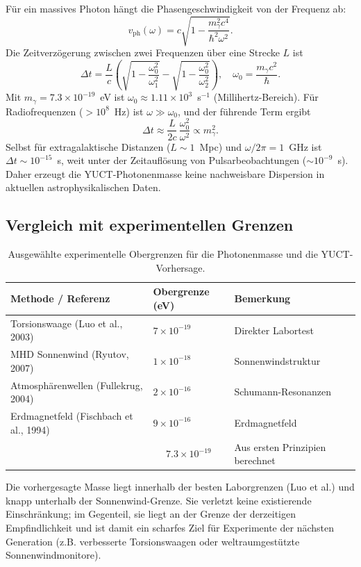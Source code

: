 \documentclass[12pt,a4paper]{article}
\begin{document}
	Für ein massives Photon hängt die Phasengeschwindigkeit von der Frequenz ab:
	\[
	v_{\text{ph}}(\omega) = c\sqrt{1 - \frac{m_\gamma^2 c^4}{\hbar^2\omega^2}} .
	\]
	Die Zeitverzögerung zwischen zwei Frequenzen über eine Strecke \(L\) ist
	\[
	\Delta t = \frac{L}{c}\left( \sqrt{1-\frac{\omega_0^2}{\omega_1^2}} - \sqrt{1-\frac{\omega_0^2}{\omega_2^2}} \right),
	\quad \omega_0 = \frac{m_\gamma c^2}{\hbar}.
	\]
	Mit \(m_\gamma = 7.3\times10^{-19}\)~eV ist \(\omega_0 \approx 1.11\times10^{3}\)~s\(^{-1}\) (Millihertz-Bereich).
	Für Radiofrequenzen (\(>10^8\)~Hz) ist \(\omega \gg \omega_0\), und der führende Term ergibt
	\[
	\Delta t \approx \frac{L}{2c}\,\frac{\omega_0^2}{\omega^2} \propto m_\gamma^2.
	\]
	Selbst für extragalaktische Distanzen (\(L\sim 1\)~Mpc) und \(\omega/2\pi = 1\)~GHz ist \(\Delta t \sim 10^{-15}\)~s,
	weit unter der Zeitauflösung von Pulsarbeobachtungen (\(\sim 10^{-9}\)~s). Daher erzeugt die YUCT-Photonenmasse
	keine nachweisbare Dispersion in aktuellen astrophysikalischen Daten.
	
	\subsection{Vergleich mit experimentellen Grenzen}
	
	\begin{table}[H]
		\centering
		\footnotesize
		\caption{Ausgewählte experimentelle Obergrenzen für die Photonenmasse und die YUCT-Vorhersage.}
		\label{tab:photon_limits}
		\begin{tabular}{p{5.2cm}p{2.2cm}p{3.6cm}}
			\toprule
			\textbf{Methode / Referenz} & \textbf{Obergrenze (eV)} & \textbf{Bemerkung} \\
			\midrule
			Torsionswaage (Luo et al., 2003) & \(7\times10^{-19}\) & Direkter Labortest \\
			MHD Sonnenwind (Ryutov, 2007) & \(1\times10^{-18}\) & Sonnenwindstruktur \\
			Atmosphärenwellen (Fullekrug, 2004) & \(2\times10^{-16}\) & Schumann-Resonanzen \\
			Erdmagnetfeld (Fischbach et al., 1994) & \(9\times10^{-16}\) & Erdmagnetfeld \\
			\addlinespace
			\multicolumn{1}{c}{\textbf{YUCT-Vorhersage}} & \multicolumn{1}{c}{\(7.3\times10^{-19}\)} & Aus ersten Prinzipien berechnet \\
			\bottomrule
		\end{tabular}
	\end{table}
	
	Die vorhergesagte Masse liegt innerhalb der besten Laborgrenzen (Luo et al.) und knapp unterhalb der
	Sonnenwind-Grenze. Sie verletzt keine existierende Einschränkung; im Gegenteil, sie liegt an der Grenze der
	derzeitigen Empfindlichkeit und ist damit ein scharfes Ziel für Experimente der nächsten Generation
	(z.B. verbesserte Torsionswaagen oder weltraumgestützte Sonnenwindmonitore).
	
\end{document}

